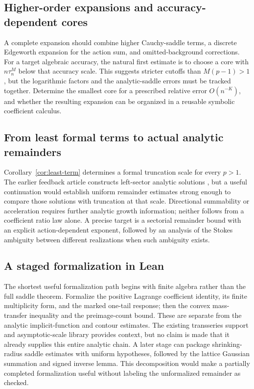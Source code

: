 \documentclass[11pt,a4paper]{article}
\numberwithin{equation}{section}
\theoremstyle{definition}
\theoremstyle{remark}
\begin{document}
\subsection{Higher-order expansions and accuracy-dependent cores}

A complete expansion should combine higher Cauchy-saddle terms, a discrete
Edgeworth expansion for the action sum, and omitted-background corrections.
For a target algebraic accuracy, the natural first estimate is to choose a
core with $n\tau_n^M$ below that accuracy scale. This suggests stricter
cutoffs than $M(p-1)>1$, but the logarithmic factors and the analytic-saddle
errors must be tracked together. Determine the smallest core for a prescribed
relative error $O(n^{-K})$, and whether the resulting expansion can be
organized in a reusable symbolic coefficient calculus.

\subsection{From least formal terms to actual analytic remainders}

Corollary~\ref{cor:least-term} determines a formal truncation scale for every
$p>1$. The earlier feedback article constructs left-sector analytic
solutions \cite{feedback}, but a useful continuation would establish
uniform remainder estimates strong enough to compare those solutions with
truncation at that scale. Directional summability or acceleration requires
further analytic growth information; neither follows from a coefficient
ratio law alone. A precise target is a sectorial remainder bound with an
explicit action-dependent exponent, followed by an analysis of the Stokes
ambiguity between different realizations when such ambiguity exists.

\subsection{A staged formalization in Lean}

The shortest useful formalization path begins with finite algebra rather
than the full saddle theorem. Formalize the positive Lagrange coefficient
identity, its finite multiplicity form, and the marked one-tail response;
then the convex mass-transfer inequality and the preimage-count bound.
These are separate from the analytic implicit-function and contour estimates.
The existing transseries support and asymptotic-scale library provides
context, but no claim is made that it already supplies this entire analytic
chain. A later stage can package shrinking-radius saddle estimates with
uniform hypotheses, followed by the lattice Gaussian summation and signed
inverse lemma. This decomposition would make a partially completed
formalization useful without labeling the unformalized remainder as checked.
\end{document}
